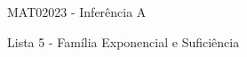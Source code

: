 \documentclass[letter,11pt]{article}
\newtheorem{exer}{Exercício}
\newcommand{\mat}[1]{\mbox{\boldmath{$#1$}}}
\begin{document}
\begin{center}{ \Large MAT02023 - Inferência A }\end{center}

\begin{center}
{\large  \sc Lista 5 - Família Exponencial e Suficiência}
\end{center}
\vspace{15mm}


% 
% 
% 
% 
% 
% 
% 
% 
% 
% 
% 
% 
% 
% 
\end{document}
